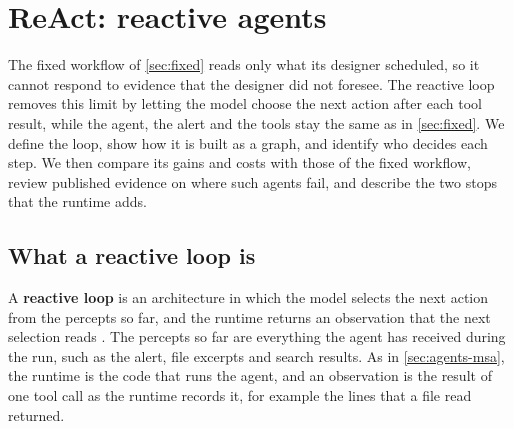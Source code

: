 \section{ReAct: reactive agents}
\label{sec:reactive}

The fixed workflow of \cref{sec:fixed} reads only what its designer scheduled, so it cannot respond
to evidence that the designer did not foresee. The reactive loop removes this limit by letting the
model choose the next action after each tool result, while the agent, the alert and the tools stay
the same as in \cref{sec:fixed}. We define the loop, show how it is built as a graph, and identify
who decides each step. We then compare its gains and costs with those of the fixed workflow, review
published evidence on where such agents fail, and describe the two stops that the runtime adds.

\subsection{What a reactive loop is}
\label{sec:reactive-loop}

A \textbf{reactive loop} is an architecture in which the model selects the next action from the
percepts so far, and the runtime returns an observation that the next selection reads
\citep[\S2]{yao2023react}. The percepts so far are everything the agent has received during the run,
such as the alert, file excerpts and search results. As in \cref{sec:agents-msa}, the runtime is
the code that runs the agent, and an observation is the result of one tool call as the runtime
records it, for example the lines that a file read returned.

